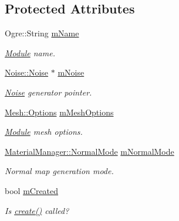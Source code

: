 \subsection*{Protected Attributes}
\begin{CompactItemize}
\item 
Ogre::String \hyperlink{class_hydrax_1_1_module_1_1_module_a478452f0e9c1bf8dde1526b30759de1}{mName}
\begin{CompactList}\small\item\em \hyperlink{class_hydrax_1_1_module_1_1_module}{Module} name. \item\end{CompactList}\item 
\hyperlink{class_hydrax_1_1_noise_1_1_noise}{Noise::Noise} $\ast$ \hyperlink{class_hydrax_1_1_module_1_1_module_9403c14c89393c8c7f562a1946ca05ab}{mNoise}
\begin{CompactList}\small\item\em \hyperlink{namespace_hydrax_1_1_noise}{Noise} generator pointer. \item\end{CompactList}\item 
\hyperlink{struct_hydrax_1_1_mesh_1_1_options}{Mesh::Options} \hyperlink{class_hydrax_1_1_module_1_1_module_99e803991d3d249baed293bdb40c56ed}{mMeshOptions}
\begin{CompactList}\small\item\em \hyperlink{class_hydrax_1_1_module_1_1_module}{Module} mesh options. \item\end{CompactList}\item 
\hyperlink{class_hydrax_1_1_material_manager_aa14689cd1c259f48954dfecda9b296f}{MaterialManager::NormalMode} \hyperlink{class_hydrax_1_1_module_1_1_module_962d19d1a608a3935440a08544919f13}{mNormalMode}
\begin{CompactList}\small\item\em Normal map generation mode. \item\end{CompactList}\item 
bool \hyperlink{class_hydrax_1_1_module_1_1_module_2b11bdd4cec12b483489e3987802a091}{mCreated}
\begin{CompactList}\small\item\em Is \hyperlink{class_hydrax_1_1_module_1_1_module_4b696328c3fc1496f757e929f44f3258}{create()} called? \item\end{CompactList}\end{CompactItemize}


